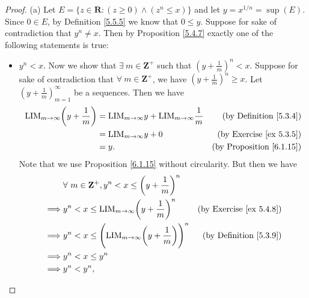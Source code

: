 \begin{proof}{(a)}
    Let \(E = \{z \in \mathbf{R} : (z \geq 0) \land (z^n \leq x)\}\) and let \(y = x^{1 / n} = \sup(E)\).
    Since \(0 \in E\), by Definition \ref{5.5.5} we know that \(0 \leq y\).
    Suppose for sake of contradiction that \(y^n \neq x\).
    Then by Proposition \ref{5.4.7} exactly one of the following statements is true:
    \begin{itemize}
        \item \(y^n < x\).
              Now we show that \(\exists\ m \in \mathbf{Z}^+\) such that \((y + \frac{1}{m})^n < x\).
              Suppose for sake of contradiction that \(\forall\ m \in \mathbf{Z}^+\), we have \((y + \frac{1}{m})^n \geq x\).
              Let \((y + \frac{1}{m})_{m = 1}^\infty\) be a sequences.
              Then we have
              \begin{align*}
                  \text{LIM}_{m \to \infty} \bigg(y + \frac{1}{m}\bigg) & = \text{LIM}_{m \to \infty} y + \text{LIM}_{m \to \infty} \frac{1}{m} & \text{(by Definition \ref{5.3.4})}   \\
                                                                        & = \text{LIM}_{m \to \infty} y + 0                                     & \text{(by Exercise \ref{ex 5.3.5})}  \\
                                                                        & = y.                                                                  & \text{(by Proposition \ref{6.1.15})}
              \end{align*}
              Note that we use Proposition \ref{6.1.15} without circularity.
              But then we have
              \begin{align*}
                           & \forall\ m \in \mathbf{Z}^+, y^n < x \leq \bigg(y + \frac{1}{m}\bigg)^n                                                \\
                  \implies & y^n < x \leq \text{LIM}_{m \to \infty} \bigg(y + \frac{1}{m}\bigg)^n             & \text{(by Exercise \ref{ex 5.4.8})} \\
                  \implies & y^n < x \leq \Bigg(\text{LIM}_{m \to \infty} \bigg(y + \frac{1}{m}\bigg)\Bigg)^n & \text{(by Definition \ref{5.3.9})}  \\
                  \implies & y^n < x \leq y^n                                                                                                       \\
                  \implies & y^n < y^n,
              \end{align*}

\end{itemize}
\end{proof}
